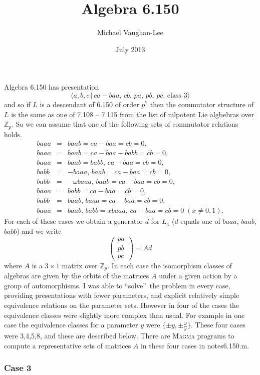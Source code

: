 \documentclass[12pt]{article}
\begin{document}
\title{Algebra 6.150}
\author{Michael Vaughan-Lee}
\date{July 2013}
\maketitle

Algebra 6.150 has presentation 
\[
\langle a,b,c\,|\,ca-baa,\,cb,\,pa,\,pb,\,pc,\,\text{class }3\rangle 
\]%
and so if $L$ is a descendant of 6.150 of order $p^{7}$ then the commutator
structure of $L$ is the same as one of 7.108 -- 7.115 from the list of
nilpotent Lie algbebras over $\mathbb{Z}_{p}$. So we can assume that one of
the following sets of commutator relations holds. 
\begin{eqnarray*}
baaa &=&baab=ca-baa=cb=0, \\
baaa &=&baab=ca-baa-babb=cb=0, \\
baaa &=&baab=babb,\,ca-baa=cb=0, \\
babb &=&-baaa,\,baab=ca-baa=cb=0, \\
babb &=&-\omega baaa,\,baab=ca-baa=cb=0, \\
baaa &=&babb=ca-baa=cb=0, \\
babb &=&baab,\,baaa=ca-baa=cb=0, \\
baaa &=&baab,\,babb=xbaaa,\,ca-baa=cb=0\;(x\neq 0,1).
\end{eqnarray*}%
For each of these cases we obtain a generator $d$ for $L_{4}$ ($d$ equals
one of $baaa$, $baab$, $babb$) and we write 
\[
\left( 
\begin{array}{l}
pa \\ 
pb \\ 
pc%
\end{array}%
\right) =Ad
\]%
where $A$ is a $3\times 1$ matrix over $\mathbb{Z}_{p}$. In each case the
isomorphism classes of algebras are given by the orbits of the matrices $A$
under a given action by a group of automorphisms. I was able to
\textquotedblleft solve\textquotedblright\ the problem in every case,
providing presentations with fewer parameters, and explicit relatively
simple equivalence relations on the parameter sets. However in four of the
cases the equivalence classes were slightly more complex than usual. For
example in one case the equivalence classes for a parameter $y$ were $\{\pm
y,\pm \frac{\omega }{y}\}$. These four cases were 3,4,5,8, and these are
described below. There are \textsc{Magma} programs to compute a
representative sets of matrices $A$ in these four cases in notes6.150.m.

\subsubsection{Case 3}
\end{document}
